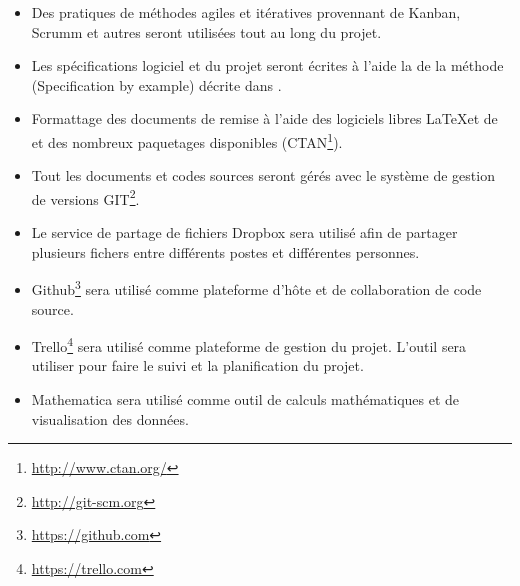 \documentclass[11pt]{article}
\begin{document}
\begin{itemize}[label={$\bullet$}]
  \item Des pratiques de méthodes agiles et itératives provennant de Kanban, Scrumm et autres seront utilisées tout au long du projet.
  \item Les spécifications logiciel et du projet seront écrites à l'aide la de la méthode (Specification by example) décrite dans \cite{Adzic11}.

  \item Formattage des documents de remise à l'aide des logiciels libres \LaTeX  et de \LuaLaTeX et des nombreux paquetages disponibles (CTAN\footnote{\url{http://www.ctan.org/}}).

  \item Tout les documents et codes sources seront gérés avec le système de gestion de versions GIT\footnote{\url{http://git-scm.org}}.

  \item Le service de partage de fichiers Dropbox sera utilisé afin de partager plusieurs fichers entre différents postes et différentes personnes.

  \item Github\footnote{\url{https://github.com}} sera utilisé comme plateforme d'hôte et de collaboration de code source.

  \item Trello\footnote{\url{https://trello.com}} sera utilisé comme plateforme de gestion du projet. L'outil sera utiliser pour faire le suivi et la planification du projet.

  \item Mathematica sera utilisé comme outil de calculs mathématiques et de visualisation des données.
\end{itemize}


%
%
%


\clearpage

\end{document}
